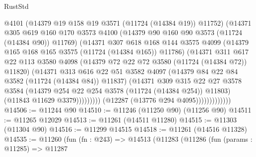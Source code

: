 \begin{lexlean}{RustStd}
\begin{coremodule}
                                @4101
                                (@14379 @19 @158 @19 @3571 (@11724 (@14384 @19)) @11752)
                                (@14371
                                  @305
                                  @619
                                  @160
                                  @170
                                  @3573
                                  @4100
                                  (@14379 @90 @160 @90 @3573 (@11724 (@14384 @90)) @11769)
                                  (@14371
                                    @307
                                    @618
                                    @168
                                    @144
                                    @3575
                                    @4099
                                    (@14379 @165 @168 @165 @3575 (@11724 (@14384 @165)) @11786)
                                    (@14371
                                      @311
                                      @617
                                      @22
                                      @113
                                      @3580
                                      @4098
                                      (@14379 @72 @22 @72 @3580 (@11724 (@14384 @72)) @11820)
                                      (@14371
                                        @313
                                        @616
                                        @22
                                        @51
                                        @3582
                                        @4097
                                        (@14379 @84 @22 @84 @3582 (@11724 (@14384 @84)) @11837)
                                        (@14371
                                          @309
                                          @315
                                          @22
                                          @27
                                          @3578
                                          @3584
                                          (@14379 @254 @22 @254 @3578 (@11724 (@14384 @254)) @11803)
                                          (@11843 @11629 @3379)))))))))
                          (@12287 (@13776 @294 @4095)))))))))))))
@14506 := @11244 @90
@14510 := @11246 (@11250 @90) (@11256 @90)
@14511 := @11265 @12029
@14513 := @11261 (@14511 @11280)
@14515 := @11303 (@11304 @90)
@14516 := @11299 @14515
@14518 := @11261 (@14516 @11328)
@14535 := @11260
    (fun (fn : @243) =>
    @14513
      (@11283
        (@11286
          (fun (params : @11285) =>
          @11287

\end{coremodule}
\end{lexlean}
